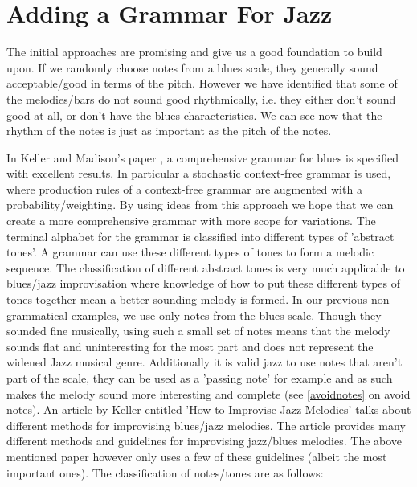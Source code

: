 \documentclass[pdftex,12pt,a4paper]{report}
\begin{document}
\section{Adding a Grammar For Jazz}
The initial approaches are promising and give us a good foundation to build upon. If we randomly choose notes from a blues scale, they generally sound acceptable/good in terms of the pitch. However we have identified that some of the melodies/bars do not sound good rhythmically, i.e. they either don't sound good at all, or don't have the blues characteristics. We can see now that the rhythm of the notes is just as important as the pitch of the notes. 

In Keller and Madison's paper \cite{keller07}, a comprehensive grammar for blues is specified with excellent results. In particular a stochastic context-free grammar is used, where production rules of a context-free grammar are augmented with a probability/weighting. By using ideas from this approach we hope that we can create a more comprehensive grammar with more scope for variations. The terminal alphabet for the grammar is classified into different types of 'abstract tones'. A grammar can use these different types of tones to form a melodic sequence. The classification of different abstract tones is very much applicable to blues/jazz improvisation where knowledge of how to put these different types of tones together mean a better sounding melody is formed. In our previous non-grammatical examples, we use only notes from the blues scale. Though they sounded fine musically, using such a small set of notes means that the melody sounds flat and uninteresting for the most part and does not represent the widened Jazz musical genre. Additionally it is valid jazz to use notes that aren't part of the scale, they can be used as a 'passing note' for example and as such makes the melody sound more interesting and complete (see \ref{avoidnotes} on avoid notes). An article by Keller entitled 'How to Improvise Jazz Melodies' \cite{jazzkeller} talks about different methods for improvising blues/jazz melodies. The article provides many different methods and guidelines for improvising jazz/blues melodies. The above mentioned paper \cite{keller07} however only uses a few of these guidelines (albeit the most important ones). The classification of notes/tones are as follows:
\end{document}

